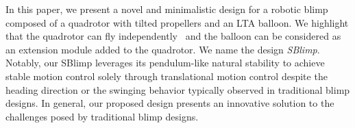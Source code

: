 \documentclass[conference]{ieeeconf}
\newcommand{\diego}[1]{{\color{brown}#1}}
\begin{document}
In this paper, we present a novel and minimalistic design for a robotic blimp composed of a quadrotor with tilted propellers and an LTA balloon. We highlight that the quadrotor can fly independently~\cite{Xu2021} and the balloon can be considered as an extension module added to the quadrotor. We name the design \emph{SBlimp}. 
Notably, our SBlimp leverages its pendulum-like natural stability to achieve stable motion control solely through translational motion control despite the heading direction or the swinging behavior typically observed in traditional blimp designs. In general, our proposed design presents an innovative solution to the challenges posed by traditional blimp designs.

%

%



\end{document}
